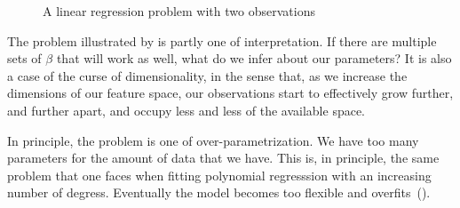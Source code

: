 \begin{figure}
  \centering
  \hfill%
  \caption{%
    A linear regression problem with two observations
  }
  \label{fig:overfitting}
\end{figure}

The problem illustrated by  is partly one of interpretation. If there are multiple sets of \(\beta\) that will work as well, what do we infer about our parameters?
It is also a case of the curse of dimensionality, in the sense that, as we increase the dimensions of our feature space, our observations start to effectively grow further, and further apart, and occupy less and less of the available space.

In principle, the problem is one of over-parametrization. We have too many parameters for the amount of data that we have. This is, in principle, the same problem that one faces when fitting polynomial regresssion with an increasing number of degress. Eventually the model becomes too flexible and overfits~().

